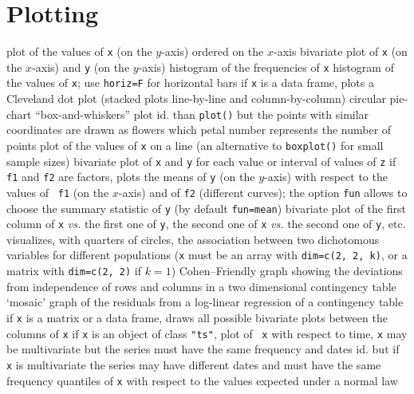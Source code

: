 \section{Plotting}{}
	{plot of the values of {\tt x} (on the $y$-axis) ordered on the
$x$-axis}
	{bivariate plot of {\tt x} (on the $x$-axis) and {\tt y}
(on the $y$-axis)}
	{ histogram of the frequencies of {\tt x}}
	{histogram of the values of {\tt x}; use {\tt horiz=F} for
horizontal bars}
	{if {\tt x} is a data frame, plots a Cleveland dot plot
(stacked plots line-by-line and column-by-column)}
	{ circular pie-chart}
	{ ``box-and-whiskers'' plot}
	{id. than {\tt plot()} but the points with similar
coordinates are drawn as flowers which petal number represents the number of
points}
	{plot of the values of {\tt x} on a line (an alternative to
{\tt boxplot()} for small sample sizes)}
	{bivariate plot of {\tt x} and {\tt y} for each
value or interval of values of {\tt z}}
	{if {\tt f1} and {\tt f2} are factors,
plots the means of {\tt y} (on the $y$-axis) with respect to the values of {\tt
f1} (on the $x$-axis) and of {\tt f2} (different curves); the option {\tt fun}
allows to choose the summary statistic of {\tt y} (by default {\tt fun=mean})}
	{bivariate plot of the first column of {\tt x} {\it vs.}
the first one of {\tt y}, the second one of {\tt x} {\it vs.} the second one of
{\tt y}, etc.}
	{visualizes, with quarters of circles, the association
between two dichotomous variables for different populations ({\tt x} must be an
array with {\tt dim=c(2, 2, k)}, or a matrix with {\tt dim=c(2, 2)} if $k=1$)}
	{ Cohen--Friendly graph showing the deviations  from
independence of rows and columns in a two dimensional contingency table}
	{ `mosaic' graph of the residuals from a log-linear
regression of a contingency table}
	{if {\tt x} is a matrix or a data frame, draws all possible
bivariate plots between the columns of {\tt x}}
	{if {\tt x} is an object of class {\tt "ts"}, plot of {\tt
x} with respect to time, {\tt x}  may be multivariate but the series must have
the same frequency and dates}
	{id. but if {\tt x} is multivariate the series may have
different dates and must have the same frequency}
	{quantiles of {\tt x} with respect to the values expected
under a normal law}
